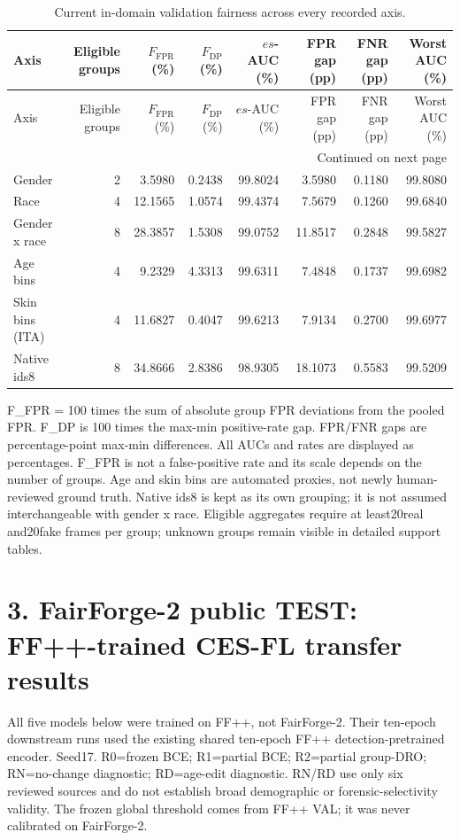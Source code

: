 \documentclass[10pt]{article}
\begin{document}
\begin{longtable}{@{}lrrrrrrr@{}}
\caption{Current in-domain validation fairness across every recorded axis.}\\
\toprule
Axis & Eligible groups & $F_{\mathrm{FPR}}$ (\%) & $F_{\mathrm{DP}}$ (\%) & $es$-AUC (\%) & FPR gap (pp) & FNR gap (pp) & Worst AUC (\%) \\
\midrule
\endfirsthead
\toprule
Axis & Eligible groups & $F_{\mathrm{FPR}}$ (\%) & $F_{\mathrm{DP}}$ (\%) & $es$-AUC (\%) & FPR gap (pp) & FNR gap (pp) & Worst AUC (\%) \\
\midrule
\endhead
\midrule
\multicolumn{8}{r}{Continued on next page}\\
\endfoot
\bottomrule
\endlastfoot
Gender & 2 & 3.5980 & 0.2438 & 99.8024 & 3.5980 & 0.1180 & 99.8080 \\
Race & 4 & 12.1565 & 1.0574 & 99.4374 & 7.5679 & 0.1260 & 99.6840 \\
Gender x race & 8 & 28.3857 & 1.5308 & 99.0752 & 11.8517 & 0.2848 & 99.5827 \\
Age bins & 4 & 9.2329 & 4.3313 & 99.6311 & 7.4848 & 0.1737 & 99.6982 \\
Skin bins (ITA) & 4 & 11.6827 & 0.4047 & 99.6213 & 7.9134 & 0.2700 & 99.6977 \\
Native ids8 & 8 & 34.8666 & 2.8386 & 98.9305 & 18.1073 & 0.5583 & 99.5209 \\
\end{longtable}

F\_FPR = 100 times the sum of absolute group FPR deviations from the pooled FPR. F\_DP is 100 times the max-min positive-rate gap. FPR/FNR gaps are percentage-point max-min differences. All AUCs and rates are displayed as percentages. F\_FPR is not a false-positive rate and its scale depends on the number of groups. Age and skin bins are automated proxies, not newly human-reviewed ground truth. Native ids8 is kept as its own grouping; it is not assumed interchangeable with gender x race. Eligible aggregates require at least20real and20fake frames per group; unknown groups remain visible in detailed support tables.

\section*{3. FairForge-2 public TEST: FF++-trained CES-FL transfer results}
All five models below were trained on FF++, not FairForge-2. Their ten-epoch downstream runs used the existing shared ten-epoch FF++ detection-pretrained encoder. Seed17. R0=frozen BCE; R1=partial BCE; R2=partial group-DRO; RN=no-change diagnostic; RD=age-edit diagnostic. RN/RD use only six reviewed sources and do not establish broad demographic or forensic-selectivity validity. The frozen global threshold comes from FF++ VAL; it was never calibrated on FairForge-2.
\end{document}
